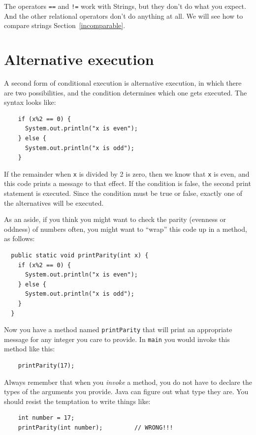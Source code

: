 \documentclass[12pt]{book}
\theoremstyle{exercise}
\begin{document}
The operators {\tt ==} and {\tt !=} work with Strings, but they
don't do what you expect.  And the other relational operators
don't do anything at all.
We will see how to compare strings Section~\ref{incomparable}.


\section {Alternative execution}
\label{alternative}

A second form of conditional execution is alternative execution,
in which there are two possibilities, and the condition determines
which one gets executed.  The syntax looks like:

\begin{lstlisting}
    if (x%2 == 0) {
      System.out.println("x is even");
    } else {
      System.out.println("x is odd");
    }
\end{lstlisting}
%
If the remainder when {\tt x} is divided by 2 is zero, then
we know that {\tt x} is even, and this code prints a message
to that effect.  If the condition is false, the second
print statement is executed.  Since the condition must
be true or false, exactly one of the alternatives will be
executed.

As an aside, if you think you might want to check the parity
(evenness or oddness) of numbers often, you might want to
``wrap'' this code up in a method, as follows:

\begin{lstlisting}
  public static void printParity(int x) {
    if (x%2 == 0) {
      System.out.println("x is even");
    } else {
      System.out.println("x is odd");
    }
  }
\end{lstlisting}
%
Now you have a method named {\tt printParity} that will print
an appropriate message for any integer you care to provide.
In {\tt main} you would invoke this method like this:

\begin{lstlisting}
    printParity(17);
\end{lstlisting}
%
Always remember that when you {\em invoke} a method, you do
not have to declare the types of the arguments you provide.
Java can figure out what type they are.  You should resist the
temptation to write things like:

\begin{lstlisting}
    int number = 17;
    printParity(int number);         // WRONG!!!
\end{lstlisting}
\end{document}
